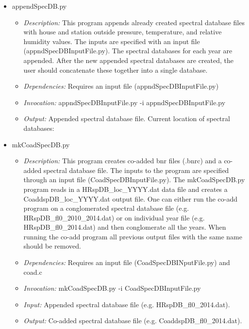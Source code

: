 \documentclass[12pt, letterpaper]{article}
\begin{document}
\begin{itemize}
\item appendSpecDB.py
\begin{itemize}
\item \textit{Description:} This program appends already created spectral database files with house and station outside pressure, temperature, and relative humidity values. The inputs are specified with an input file (appndSpecDBInputFile.py). The spectral databases for each year are appended. After the new appended spectral databases are created, the user should concatenate these together into a single database.
\item \textit{Dependencies:} Requires an input file (appndSpecDBInputFile.py)
\item \textit{Invocation:} appndSpecDBInputFile.py -i appndSpecDBInputFile.py
\item \textit{Output:} Appended spectral database file. Current location of spectral databases: 
\end{itemize}
\end{itemize}

\begin{itemize}
\item mkCoadSpecDB.py
\begin{itemize}
\item \textit{Description:} This program creates co-added bnr files (.bnrc) and a co-added spectral database file. The inputs to the program are specified through an input file (CoadSpecDBInputFile.py). The mkCoadSpecDB.py program reads in a HRspDB\_loc\_YYYY.dat data file and creates a CoaddspDB\_loc\_YYYY.dat output file. One can either run the co-add program on a conglomerated spectral database file (e.g. HRspDB\_fl0\_2010\_2014.dat) or on individual year file (e.g. HRspDB\_fl0\_2014.dat) and then conglomerate all the years. When running the co-add program all previous output files with the same name should be removed.
\item \textit{Dependencies:} Requires an input file (CoadSpecDBINputFile.py) and coad.c
\item \textit{Invocation:} mkCoadSpecDB.py -i CoadSpecDBInputFile.py
\item \textit{Input:} Appended spectral database file (e.g. HRspDB\_fl0\_2014.dat). 
\item \textit{Output:} Co-added spectral database file (e.g. CoaddspDB\_fl0\_2014.dat).
\end{itemize}
\end{itemize}
\end{document}
